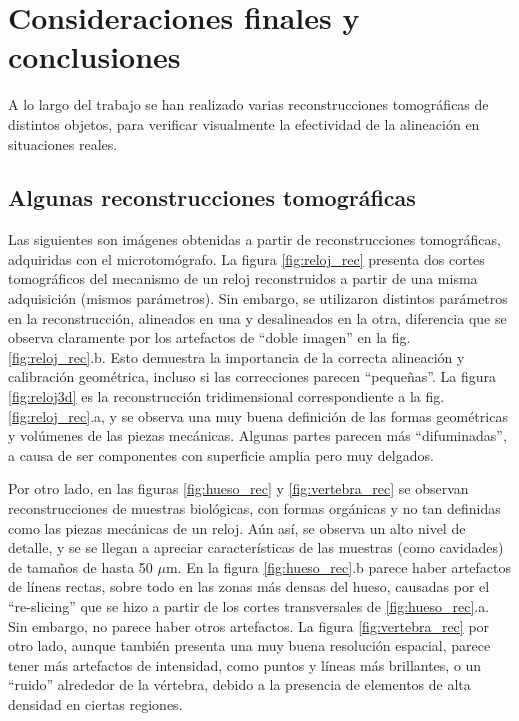 \chapter{Consideraciones finales y conclusiones}
\label{conclusiones}

A lo largo del trabajo se han realizado varias reconstrucciones tomográficas de distintos
objetos, para verificar visualmente la efectividad de la alineación en situaciones reales.

\section{Algunas reconstrucciones tomográficas}

Las siguientes son imágenes obtenidas a partir de reconstrucciones tomográficas, adquiridas con
el microtomógrafo. La figura \ref{fig:reloj_rec} presenta dos cortes tomográficos del mecanismo
de un reloj reconstruidos a partir de una misma adquisición (mismos parámetros). Sin embargo, se utilizaron distintos
parámetros en la reconstrucción, alineados en una y desalineados en la otra, diferencia que se
observa claramente por los artefactos de ``doble imagen'' en la fig. \ref{fig:reloj_rec}.b. Esto
demuestra la importancia de la correcta alineación y calibración geométrica, incluso si las
correcciones parecen ``pequeñas''. La figura \ref{fig:reloj3d} es la reconstrucción tridimensional
correspondiente a la fig. \ref{fig:reloj_rec}.a, y se observa una muy buena definición de las
formas geométricas y volúmenes de las piezas mecánicas. Algunas partes parecen más ``difuminadas'',
a causa de ser componentes con superficie amplia pero muy delgados.

Por otro lado, en las figuras \ref{fig:hueso_rec} y \ref{fig:vertebra_rec} se observan reconstrucciones
de muestras biológicas, con formas orgánicas y no tan definidas como las piezas mecánicas de un
reloj. Aún así, se observa un alto nivel de detalle, y se se llegan a apreciar características de
las muestras (como cavidades) de tamaños de hasta 50 $\mu$m. En la figura \ref{fig:hueso_rec}.b
parece haber artefactos de líneas rectas, sobre todo en las zonas más densas del hueso, causadas
por el ``re-slicing'' que se hizo a partir de los cortes transversales de \ref{fig:hueso_rec}.a.
Sin embargo, no parece haber otros artefactos. La figura \ref{fig:vertebra_rec} por otro lado,
aunque también presenta una muy buena resolución espacial, parece tener más artefactos de intensidad,
como puntos y líneas más brillantes, o un ``ruido'' alrededor de la vértebra, debido a la presencia
de elementos de alta densidad en ciertas regiones.

